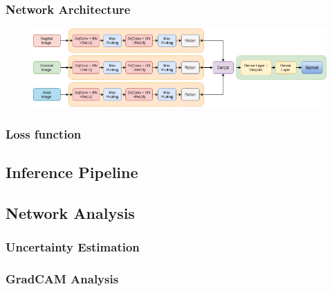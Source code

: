 \documentclass[runningheads]{llncs}
\begin{document}
\subsubsection{Network Architecture}
\begin{figure}
 \centering
 \label{fig:network}
 \includegraphics[width=1\textwidth]{images/network.png}
 \caption{}
\end{figure}

\subsubsection{Loss function}


\subsection{Inference Pipeline}

\subsection{Network Analysis}
\subsubsection{Uncertainty Estimation}
\subsubsection{GradCAM Analysis}


\newpage
\end{document}
